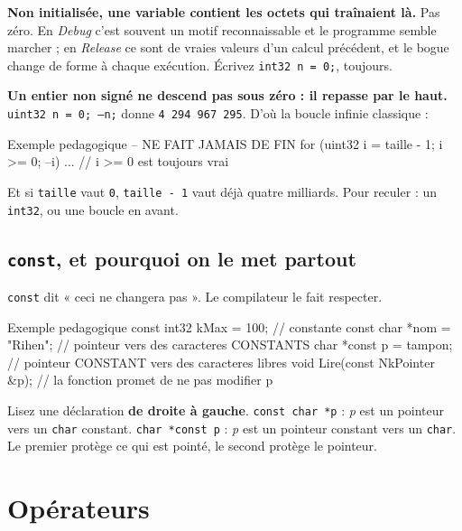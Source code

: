 \begin{nkpiege}
\textbf{Non initialisée, une variable contient les octets qui traînaient là.} Pas
zéro. En \emph{Debug} c'est souvent un motif reconnaissable et le programme
semble marcher ; en \emph{Release} ce sont de vraies valeurs d'un calcul
précédent, et le bogue change de forme à chaque exécution. Écrivez
\texttt{int32 n = 0;}, toujours.
\end{nkpiege}

\begin{nkpiege}
\textbf{Un entier non signé ne descend pas sous zéro : il repasse par le haut.}
\texttt{uint32 n = 0; --n;} donne \texttt{4\,294\,967\,295}. D'où la boucle
infinie classique :

\begin{nkcode}{Exemple pedagogique -- NE FAIT JAMAIS DE FIN}
for (uint32 i = taille - 1; i >= 0; --i) { ... }   // i >= 0 est toujours vrai
\end{nkcode}

Et si \texttt{taille} vaut \texttt{0}, \texttt{taille - 1} vaut déjà quatre
milliards. Pour reculer : un \texttt{int32}, ou une boucle en avant.
\end{nkpiege}

\subsection{\texttt{const}, et pourquoi on le met partout}

\texttt{const} dit « ceci ne changera pas ». Le compilateur le fait respecter.

\begin{nkcode}{Exemple pedagogique}
const int32 kMax = 100;          // constante
const char *nom = "Rihen";       // pointeur vers des caracteres CONSTANTS
char *const p = tampon;          // pointeur CONSTANT vers des caracteres libres
void Lire(const NkPointer &p);   // la fonction promet de ne pas modifier p
\end{nkcode}

\begin{nkretenir}
Lisez une déclaration \textbf{de droite à gauche}. \texttt{const char *p} :
\emph{p} est un pointeur vers un \texttt{char} constant. \texttt{char *const p} :
\emph{p} est un pointeur constant vers un \texttt{char}. Le premier protège ce
qui est pointé, le second protège le pointeur.
\end{nkretenir}

\section{Opérateurs}

